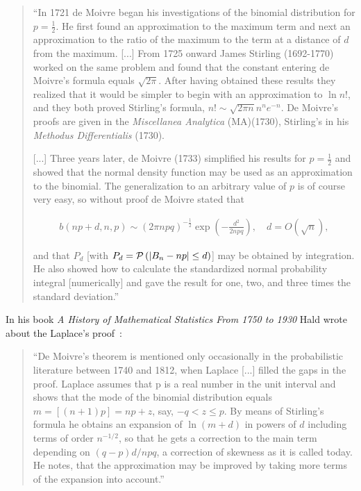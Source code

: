 \begin{quotation}
  ``In 1721 de Moivre began his investigations of the binomial distribution for $p=\tfrac 12$. He first found an approximation to the maximum term and next an approximation to the ratio of the maximum to the term at a distance of $d$ from the maximum. [...] From 1725 onward James Stirling (1692-1770) worked on the same problem and found that the constant entering de Moivre's formula equals $\sqrt{2\pi}$. After having obtained these results they realized that it would be simpler to begin with an approximation to $\ln n!$, and they both proved Stirling's formula, $n! \sim \sqrt{2\pi n}n^ne^{-n}$. De Moivre's proofs are given in the \emph{Miscellanea Analytica} (MA)(1730), Stirling's in his \emph{Methodus Differentialis} (1730).

  [...] Three years later, de Moivre (1733) simplified his results for $p=\tfrac 12$ and showed that the normal density function may be used as an approximation to the binomial. The generalization to an arbitrary value of $p$ is of course very easy, so without proof de Moivre stated that

  \begin{align*}
      b(np+d,n,p) \sim (2\pi npq)^{-\tfrac 12} \exp\left( -\frac{d^2}{2npq} \right),\quad d = O(\sqrt n),
  \end{align*}

  and that $P_d$ [with $P_d=\mathcal P\left({|B_{n} -np|\le d}\right)$] may be obtained by integration. He also showed how to calculate the standardized normal probability integral [numerically] and gave the result for one, two, and three times the standard deviation.''
\end{quotation}


In his book \emph{A History of Mathematical Statistics From 1750 to 1930} Hald wrote about the Laplace's proof~\cite[p. 24]{hald2}:

\begin{quote}
  ``De Moivre's theorem is mentioned only occasionally in the probabilistic literature between 1740 and 1812, when Laplace [...] filled the gaps in the proof. Laplace assumes that p is a real number in the unit interval and shows that the mode of the binomial distribution equals $m=[(n+1)p]=np+z$, say, $-q < z \le p$. By means of Stirling's formula he obtains an expansion of $\ln(m+d)$ in powers of $d$ including terms of order $n^{-1/2}$, so that he gets a correction to the main term depending on $(q-p)d/npq$, a correction of skewness as it is called today. He notes, that the approximation may be improved by taking more terms of the expansion into account.''
\end{quote}

